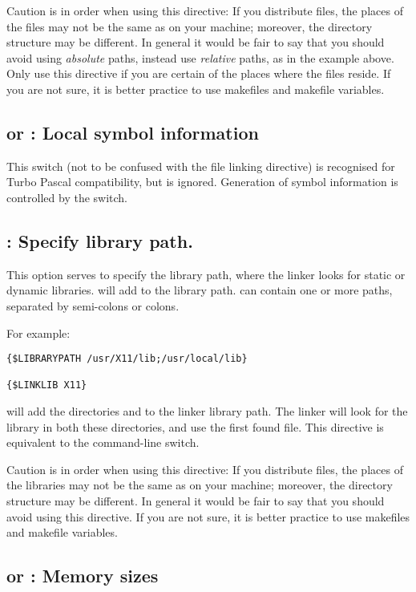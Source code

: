 Caution is in order when using this directive: If you distribute files, the
places of the files may not be the same as on your machine; moreover, the
directory structure may be different. In general it would be fair to say
that you should avoid using {\em absolute} paths, instead use {\em relative}
paths, as in the example above. Only use this directive if you are certain
of the places where the files reside. If you are not sure, it is better
practice to use makefiles and makefile variables.

\subsection{ or  : Local symbol information}

This switch (not to be confused with the  file linking
directive) is recognised for Turbo Pascal compatibility, but is ignored.
Generation of symbol information is controlled by the  switch.

\subsection{ : Specify library path.}

This option serves to specify the library path, where the linker looks for
static or dynamic libraries.  will add 
to the library path.  can contain one or more paths, separated
by semi-colons or colons.

For example:
\begin{verbatim}
{$LIBRARYPATH /usr/X11/lib;/usr/local/lib}

{$LINKLIB X11}
\end{verbatim}

will add the directories  and  to
the linker library path. The linker will look for the library 
in both these directories, and use the first found file. This directive is
equivalent to the  command-line switch.

Caution is in order when using this directive: If you distribute files, the
places of the libraries may not be the same as on your machine; moreover, the
directory structure may be different. In general it would be fair to say
that you should avoid using this directive. If you are not sure, it is better
practice to use makefiles and makefile variables.

\subsection{ or  : Memory sizes}

